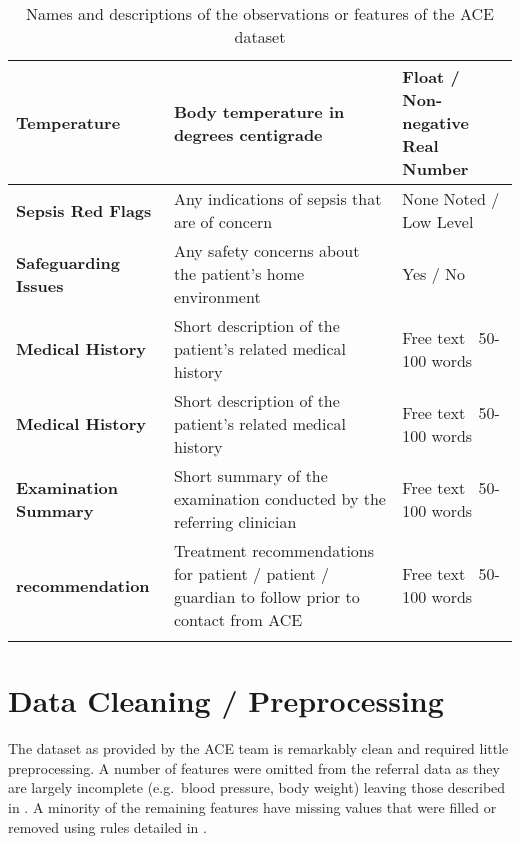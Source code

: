 \begin{longtable}[h]{ P{40mm}  P{45mm} P{45mm} }
    \textbf{Temperature} & Body temperature in degrees centigrade & Float / Non-negative Real Number \\\midrule
    \textbf{Sepsis Red Flags} & Any indications of sepsis that are of concern & None Noted / Low Level \\\midrule
    \textbf{Safeguarding Issues} & Any safety concerns about the patient's home environment & Yes / No\\\midrule
    \textbf{Medical History} & Short description of the patient's related medical history & Free text ~50-100 words \\\midrule
    \textbf{Medical History} & Short description of the patient's related medical history & Free text ~50-100 words \\\midrule
    \textbf{Examination Summary} & Short summary of the examination conducted by the referring clinician & Free text ~50-100 words \\\midrule
    \textbf{recommendation} & Treatment recommendations for patient / patient / guardian to follow prior to contact from ACE & Free text ~50-100 words \\\toprule
    \caption{Names and descriptions of the observations or features of the ACE dataset}
    \label{tab:feature-descriptions}
\end{longtable}

\section{Data Cleaning / Preprocessing}\label{sec:data-cleaning-/-preprocessing}

The dataset as provided by the ACE team is remarkably clean and required little preprocessing.
A number of features were omitted from the referral data as they are largely incomplete (e.g.\ blood pressure, body weight) leaving those described in  .
A minority of the remaining features have missing values that were filled or removed using rules detailed in .

